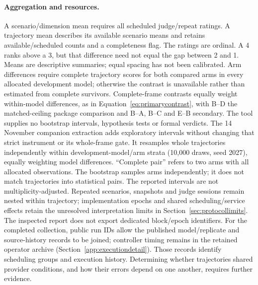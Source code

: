 \paragraph{Aggregation and resources.}
A scenario/dimension mean requires all scheduled judge/repeat ratings.
A trajectory mean describes its available scenario means and retains
available/scheduled counts and a completeness flag. The ratings are ordinal. A 4 ranks above a 3, but that difference need not
equal the gap between 2 and 1. Means are descriptive summaries; equal
spacing has not been calibrated.
Arm differences require complete trajectory scores for both compared
arms in every allocated development model; otherwise the contrast is
unavailable rather than estimated from complete survivors. Complete-frame
contrasts equally weight within-model differences, as in
Equation~\ref{eq:primarycontrast}, with B--D the matched-ceiling package
comparison and B--A, B--C and E--B secondary. The tool supplies no
bootstrap intervals, hypothesis tests or formal verdicts. The 14 November
companion extraction adds exploratory intervals without changing that
strict instrument or its whole-frame gate. It resamples whole trajectories
independently within development-model/arm strata (10,000 draws, seed 2027),
equally weighting model differences. ``Complete pair'' refers to two arms with all allocated observations.
The bootstrap samples arms independently; it
does not match trajectories into statistical pairs. The reported intervals are not multiplicity-adjusted.
Repeated scenarios, snapshots and judge sessions remain nested within
trajectory; implementation epochs and shared scheduling/service effects
retain the unresolved interpretation limits in
Section~\ref{sec:protocollimits}. The inspected report does not export
dedicated block/epoch identifiers. For the completed collection, public
run IDs allow the published model/replicate and source-history records to
be joined; controller timing remains in the retained operator archive
(Section~\ref{app:executiondetail}). Those records identify scheduling groups and execution history.
Determining whether trajectories shared provider conditions, and how
their errors depend on one another, requires further evidence.

